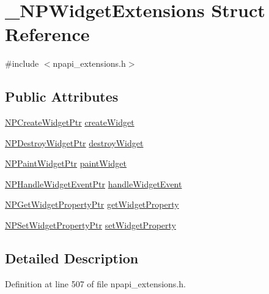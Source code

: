\hypertarget{struct___n_p_widget_extensions}{
\section{\_\-NPWidgetExtensions Struct Reference}
\label{struct___n_p_widget_extensions}
}


{\ttfamily \#include $<$npapi\_\-extensions.h$>$}

\subsection*{Public Attributes}
\begin{DoxyCompactItemize}
\item 
\hyperlink{npapi__extensions_8h_abff4046dcfab965b3e91b0bc6f81a191}{NPCreateWidgetPtr} \hyperlink{struct___n_p_widget_extensions_ab6dda813076e419413bf48db9a22422e}{createWidget}
\item 
\hyperlink{npapi__extensions_8h_ad465d3f058b0f8c3dcfee2e2575dfb64}{NPDestroyWidgetPtr} \hyperlink{struct___n_p_widget_extensions_a640abaafa2cb5544233a5cbd892c90c0}{destroyWidget}
\item 
\hyperlink{npapi__extensions_8h_ab0aa503371ea560cdf1ca8b7b2e18af3}{NPPaintWidgetPtr} \hyperlink{struct___n_p_widget_extensions_aceadbaa0477e07b76bd8d94f32c1547a}{paintWidget}
\item 
\hyperlink{npapi__extensions_8h_a160e9c388ac38a57286619e69985d82a}{NPHandleWidgetEventPtr} \hyperlink{struct___n_p_widget_extensions_a2bb38c0a960ee8e8d3d80a77ea77087a}{handleWidgetEvent}
\item 
\hyperlink{npapi__extensions_8h_a9a52de31fde3f4099fe5f5be01b799a7}{NPGetWidgetPropertyPtr} \hyperlink{struct___n_p_widget_extensions_a8f9e66275fd10db4471a6edb2f9fd6e9}{getWidgetProperty}
\item 
\hyperlink{npapi__extensions_8h_a9a53efaef2e5ec6314c2c0a436212677}{NPSetWidgetPropertyPtr} \hyperlink{struct___n_p_widget_extensions_a7645f4bcbe3ec7d3c1286487d9a2eb65}{setWidgetProperty}
\end{DoxyCompactItemize}


\subsection{Detailed Description}


Definition at line 507 of file npapi\_\-extensions.h.



